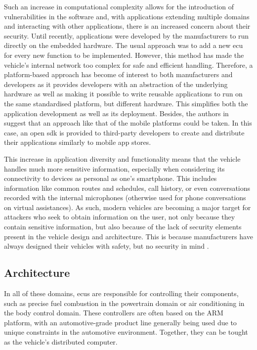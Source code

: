 Such an increase in computational complexity allows for the introduction of vulnerabilities in the software and, with applications extending multiple domains and interacting with other applications, there is an increased concern about their security. Until recently, applications were developed by the manufacturers to run directly on the embedded hardware. The usual approach was to add a new \gls{ecu} for every new function to be implemented. However, this method has made the vehicle's internal network too complex for safe and efficient handling. Therefore, a platform-based approach has become of interest to both manufacturers and developers as it provides developers with an abstraction of the underlying hardware as well as making it possible to write reusable applications to run on the same standardised platform, but different hardware. This simplifies both the application development as well as its deployment. Besides, the authors in \cite{Holle} suggest that an approach like that of the mobile platforms could be taken. In this case, an open \gls{sdk} is provided to third-party developers to create and distribute their applications similarly to mobile app stores.\par

This increase in application diversity and functionality means that the vehicle handles much more sensitive information, especially when considering its connectivity to devices as personal as one's smartphone. This includes information like common routes and schedules, call history, or even conversations recorded with the internal microphones (otherwise used for phone conversations on virtual assistances). As such, modern vehicles are becoming a major target for attackers who seek to obtain information on the user, not only because they contain sensitive information, but also because of the lack of security elements present in the vehicle design and architecture. This is because manufacturers have always designed their vehicles with safety, but no security in mind \citep{Siegel2018}.

\subsection{Architecture}

In all of these domains, \glspl{ecu} are responsible for controlling their components, such as precise fuel combustion in the powertrain domain or air conditioning in the body control domain. These controllers are often based on the ARM platform, with an automotive-grade product line generally being used due to unique constraints in the automotive environment. Together, they can be tought as the vehicle's distributed computer.\par

